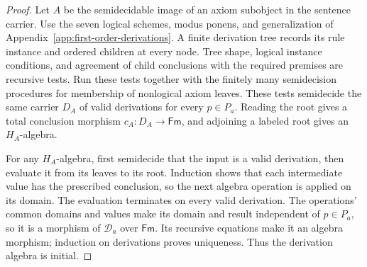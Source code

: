 \begin{proof}
Let $A$ be the semidecidable image of an axiom subobject in the
sentence carrier. Use the seven logical schemes, modus ponens,
and generalization of Appendix~\ref{app:first-order-derivations}.
A finite derivation tree records its rule instance and ordered
children at every node. Tree shape, logical instance conditions,
and agreement of child conclusions with the required premises are
recursive tests. Run these tests together with the finitely many
semidecision procedures for membership of nonlogical axiom leaves.
These tests semidecide the same carrier $D_A$ of valid derivations
for every $p\in P_a$. Reading the root gives a total conclusion morphism
$c_A:D_A\to\mathsf{Fm}$, and adjoining a labeled root gives an
$H_A$-algebra.

For any $H_A$-algebra, first semidecide that the input is a valid
derivation, then evaluate it from its leaves to its root. Induction
shows that each intermediate value has the prescribed conclusion,
so the next algebra operation is applied on its domain. The
evaluation terminates on every valid derivation. The operations'
common domains and values make its domain and result independent
of $p\in P_a$, so it is a morphism of $\mathcal D_a$ over
$\mathsf{Fm}$. Its recursive equations make it an algebra morphism;
induction on derivations proves uniqueness. Thus the derivation
algebra is initial.
\end{proof}

